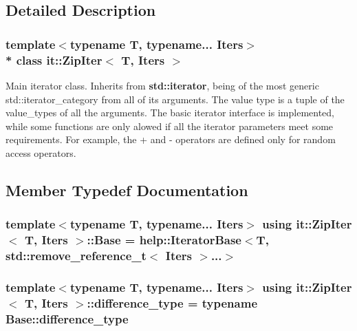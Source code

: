 \subsection{Detailed Description}
\subsubsection*{template$<$typename T, typename... Iters$>$\\*
class it\+::\+Zip\+Iter$<$ T, Iters $>$}

Main iterator class. Inherits from {\bf std\+::iterator}, being of the most generic std\+::iterator\+\_\+category from all of its arguments. The value type is a tuple of the value\+\_\+type\textquotesingle{}s of all the arguments. The basic iterator interface is implemented, while some functions are only alowed if all the iterator parameters meet some requirements. For example, the \textquotesingle{}+\textquotesingle{} and \textquotesingle{}-\/\textquotesingle{} operators are defined only for random access operators. 

\subsection{Member Typedef Documentation}
\subsubsection[{\texorpdfstring{Base}{Base}}]{\setlength{\rightskip}{0pt plus 5cm}template$<$typename T, typename... Iters$>$ using {\bf it\+::\+Zip\+Iter}$<$ T, Iters $>$\+::{\bf Base} =  {\bf help\+::\+Iterator\+Base}$<$T, std\+::remove\+\_\+reference\+\_\+t$<$ Iters $>$...$>$}\hypertarget{classit_1_1ZipIter_a360e2773db66d921e24432654349854b}{}\label{classit_1_1ZipIter_a360e2773db66d921e24432654349854b}
\subsubsection[{\texorpdfstring{difference\+\_\+type}{difference_type}}]{\setlength{\rightskip}{0pt plus 5cm}template$<$typename T, typename... Iters$>$ using {\bf it\+::\+Zip\+Iter}$<$ T, Iters $>$\+::{\bf difference\+\_\+type} =  typename Base\+::difference\+\_\+type}\hypertarget{classit_1_1ZipIter_aa43876b6c6be6aa68d6b8ce7c93cf8fd}{}\label{classit_1_1ZipIter_aa43876b6c6be6aa68d6b8ce7c93cf8fd}
